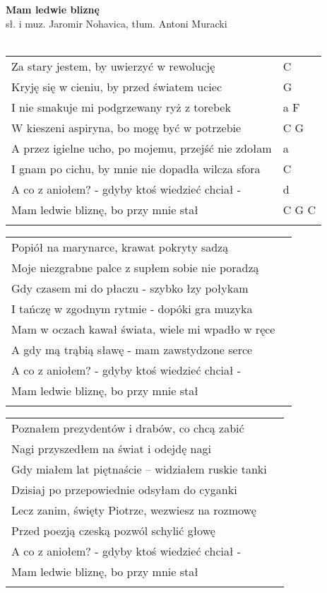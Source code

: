 \documentclass[a5paper]{article}
\begin{document}


\noindent
\fontsize{12pt}{15pt}\selectfont
\textbf{Mam ledwie bliznę} \\
\fontsize{8pt}{10pt}\selectfont
sł. i muz. Jaromir Nohavica, tłum. Antoni Muracki \\ \\
\fontsize{10pt}{12pt}\selectfont
{}
\begin{tabular}{@{}p{9.5cm}p{3cm}@{}}
\noindent
Za stary jestem, by uwierzyć w rewolucję & C \\
Kryję się w cieniu, by przed światem uciec & G \\
I nie smakuje mi podgrzewany ryż z torebek & a F \\
W kieszeni aspiryna, bo mogę być w potrzebie & C G \\
A przez igielne ucho, po mojemu, przejść nie zdołam & a \\
I gnam po cichu, by mnie nie dopadła wilcza sfora & C \\
A co z aniołem? - gdyby ktoś wiedzieć chciał - & d \\
Mam ledwie bliznę, bo przy mnie stał & C G C \\ \\
\end{tabular}

\noindent
{}
\begin{tabular}{@{}p{9.5cm}p{3cm}@{}}
\noindent
Popiół na marynarce, krawat pokryty sadzą \\
Moje niezgrabne palce z supłem sobie nie poradzą \\
Gdy czasem mi do płaczu - szybko łzy połykam \\
I tańczę w zgodnym rytmie - dopóki gra muzyka	\\
Mam w oczach kawał świata, wiele mi wpadło w ręce	\\
A gdy mą trąbią sławę - mam zawstydzone serce	\\
A co z aniołem? - gdyby ktoś wiedzieć chciał -	\\
Mam ledwie bliznę, bo przy mnie stał	\\ \\
\end{tabular}

\noindent
{}
\begin{tabular}{@{}p{9.5cm}p{3cm}@{}}
\noindent
Poznałem prezydentów i drabów, co chcą zabić	\\
Nagi przyszedłem na świat i odejdę nagi	\\
Gdy miałem lat piętnaście – widziałem ruskie tanki	\\
Dzisiaj po przepowiednie odsyłam do cyganki	\\
Lecz zanim, święty Piotrze, wezwiesz na rozmowę	\\
Przed poezją czeską pozwól schylić głowę	\\
A co z aniołem? - gdyby ktoś wiedzieć chciał -	\\
Mam ledwie bliznę, bo przy mnie stał	\\ \\
\end{tabular}
\end{document}
